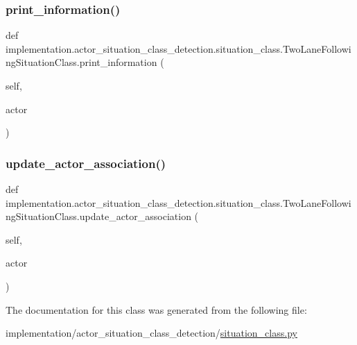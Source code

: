 \subsubsection{\texorpdfstring{print\+\_\+information()}{print\_information()}}
{\footnotesize\ttfamily def implementation.\+actor\+\_\+situation\+\_\+class\+\_\+detection.\+situation\+\_\+class.\+Two\+Lane\+Following\+Situation\+Class.\+print\+\_\+information (\begin{DoxyParamCaption}\item[{}]{self,  }\item[{}]{actor }\end{DoxyParamCaption})}

\mbox{\label{classimplementation_1_1actor__situation__class__detection_1_1situation__class_1_1_two_lane_following_situation_class_a4c3480d6a606fcbafb5de3449a04cb57}} 
\subsubsection{\texorpdfstring{update\+\_\+actor\+\_\+association()}{update\_actor\_association()}}
{\footnotesize\ttfamily def implementation.\+actor\+\_\+situation\+\_\+class\+\_\+detection.\+situation\+\_\+class.\+Two\+Lane\+Following\+Situation\+Class.\+update\+\_\+actor\+\_\+association (\begin{DoxyParamCaption}\item[{}]{self,  }\item[{}]{actor }\end{DoxyParamCaption})}



The documentation for this class was generated from the following file\+:\begin{DoxyCompactItemize}
\item 
implementation/actor\+\_\+situation\+\_\+class\+\_\+detection/\hyperlink{situation__class_8py}{situation\+\_\+class.\+py}\end{DoxyCompactItemize}
